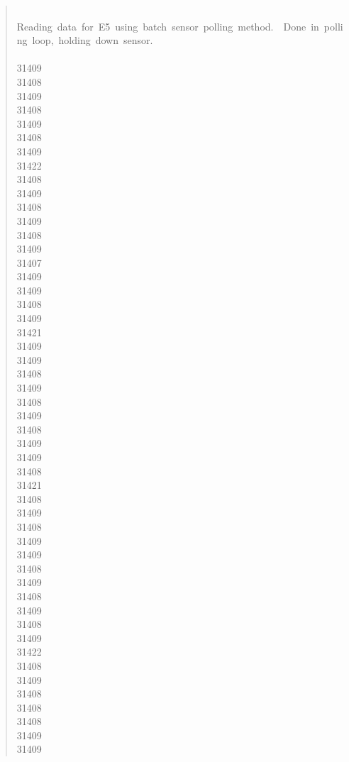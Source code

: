 \documentclass[letterpaper]{article}
\begin{document}
\begin{quote}
{~\\
Reading~data~for~E5~using~batch~sensor~polling~method.~~Done~in~polling~loop,~holding~down~sensor.\\
~\\
31409\\
31408\\
31409\\
31408\\
31409\\
31408\\
31409\\
31422\\
31408\\
31409\\
31408\\
31409\\
31408\\
31409\\
31407\\
31409\\
31409\\
31408\\
31409\\
31421\\
31409\\
31409\\
31408\\
31409\\
31408\\
31409\\
31408\\
31409\\
31409\\
31408\\
31421\\
31408\\
31409\\
31408\\
31409\\
31409\\
31408\\
31409\\
31408\\
31409\\
31408\\
31409\\
31422\\
31408\\
31409\\
31408\\
31408\\
31408\\
31409\\
31409\\
}
\end{quote}
\end{document}
